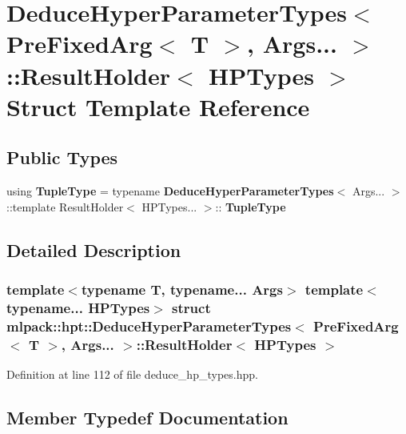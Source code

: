 \section{Deduce\+Hyper\+Parameter\+Types$<$ Pre\+Fixed\+Arg$<$ T $>$, Args... $>$\+:\+:Result\+Holder$<$ H\+P\+Types $>$ Struct Template Reference}
\label{structmlpack_1_1hpt_1_1DeduceHyperParameterTypes_3_01PreFixedArg_3_01T_01_4_00_01Args_8_8_8_01_4_1_1ResultHolder}
\subsection*{Public Types}
\begin{DoxyCompactItemize}
\item 
using \textbf{ Tuple\+Type} = typename \textbf{ Deduce\+Hyper\+Parameter\+Types}$<$ Args... $>$\+::template Result\+Holder$<$ H\+P\+Types... $>$\+::\textbf{ Tuple\+Type}
\end{DoxyCompactItemize}


\subsection{Detailed Description}
\subsubsection*{template$<$typename T, typename... Args$>$\newline
template$<$typename... H\+P\+Types$>$\newline
struct mlpack\+::hpt\+::\+Deduce\+Hyper\+Parameter\+Types$<$ Pre\+Fixed\+Arg$<$ T $>$, Args... $>$\+::\+Result\+Holder$<$ H\+P\+Types $>$}



Definition at line 112 of file deduce\+\_\+hp\+\_\+types.\+hpp.



\subsection{Member Typedef Documentation}
\mbox{\label{structmlpack_1_1hpt_1_1DeduceHyperParameterTypes_3_01PreFixedArg_3_01T_01_4_00_01Args_8_8_8_01_4_1_1ResultHolder_ae2594da27993362e9262ba5811fccabb}} 
